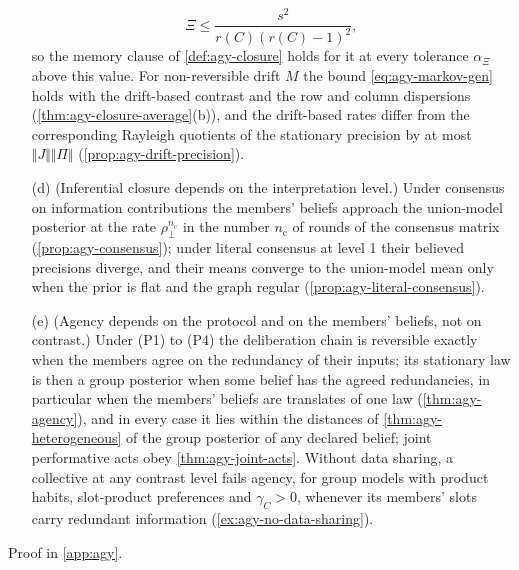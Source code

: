 \begin{theorem}
\begin{enumerate}
\begin{equation}
\Xi\le\frac{s^2}{r(C)(r(C)-1)^2},
\end{equation}
so the memory clause of \cref{def:agy-closure} holds for it at every tolerance $\alpha_\Xi$ above this value. For non-reversible drift $M$ the bound \eqref{eq:agy-markov-gen} holds with the drift-based contrast and the row and column dispersions (\cref{thm:agy-closure-average}(b)), and the drift-based rates differ from the corresponding Rayleigh quotients of the stationary precision by at most $\Vert J\Vert\Vert\Pi\Vert$ (\cref{prop:agy-drift-precision}).
\item[(d)] (Inferential closure depends on the interpretation level.) Under consensus on information contributions the members' beliefs approach the union-model posterior at the rate $\rho_\perp^{n_{\mathrm c}}$ in the number $n_{\mathrm c}$ of rounds of the consensus matrix (\cref{prop:agy-consensus}); under literal consensus at level 1 their believed precisions diverge, and their means converge to the union-model mean only when the prior is flat and the graph regular (\cref{prop:agy-literal-consensus}).
\item[(e)] (Agency depends on the protocol and on the members' beliefs, not on contrast.) Under (P1) to (P4) the deliberation chain is reversible exactly when the members agree on the redundancy of their inputs; its stationary law is then a group posterior when some belief has the agreed redundancies, in particular when the members' beliefs are translates of one law (\cref{thm:agy-agency}), and in every case it lies within the distances of \cref{thm:agy-heterogeneous} of the group posterior of any declared belief; joint performative acts obey \cref{thm:agy-joint-acts}. Without data sharing, a collective at any contrast level fails agency, for group models with product habits, slot-product preferences and $\gamma_C>0$, whenever its members' slots carry redundant information (\cref{ex:agy-no-data-sharing}).
\end{enumerate}
Proof in \cref{app:agy}.
\end{theorem}

